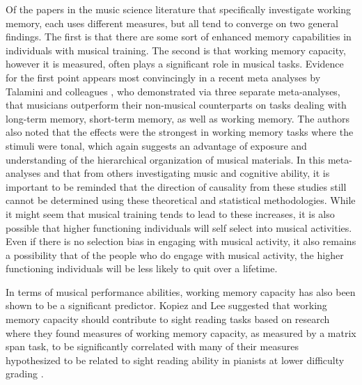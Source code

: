 \documentclass[12pt,]{book}
\begin{document}
Of the papers in the music science literature that specifically investigate working memory, each uses different measures, but all tend to converge on two general findings.
The first is that there are some sort of enhanced memory capabilities in individuals with musical training.
The second is that working memory capacity, however it is measured, often plays a significant role in musical tasks.
Evidence for the first point appears most convincingly in a recent meta analyses by Talamini and colleagues \citep{talaminiMusiciansHaveBetter2017}, who demonstrated via three separate meta-analyses, that musicians outperform their non-musical counterparts on tasks dealing with long-term memory, short-term memory, as well as working memory.
The authors also noted that the effects were the strongest in working memory tasks where the stimuli were tonal, which again suggests an advantage of exposure and understanding of the hierarchical organization of musical materials.
In this meta-analyses and that from others investigating music and cognitive ability, it is important to be reminded that the direction of causality from these studies still cannot be determined using these theoretical and statistical methodologies.
While it might seem that musical training tends to lead to these increases, it is also possible that higher functioning individuals will self select into musical activities.
Even if there is no selection bias in engaging with musical activity, it also remains a possibility that of the people who do engage with musical activity, the higher functioning individuals will be less likely to quit over a lifetime.

In terms of musical performance abilities, working memory capacity has also been shown to be a significant predictor.
Kopiez and Lee suggested that working memory capacity should contribute to sight reading tasks based on research where they found measures of working memory capacity, as measured by a matrix span task, to be significantly correlated with many of their measures hypothesized to be related to sight reading ability in pianists at lower difficulty grading \citep{kopiezDynamicModelSkills2006, kopiezGeneralModelSkills2008}.
\end{document}
